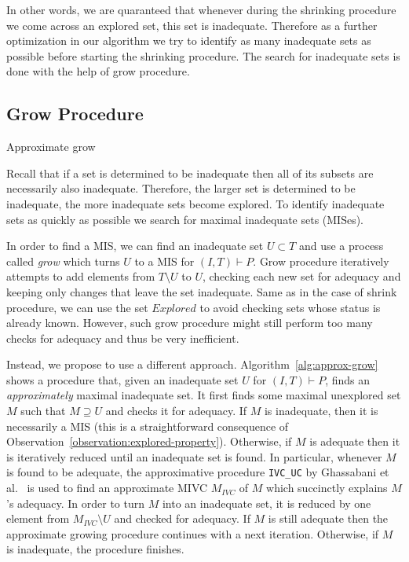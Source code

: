 In other words, we are quaranteed that whenever during the shrinking procedure we come across an explored set, this set is inadequate. Therefore as a further optimization in our algorithm we try to identify as many inadequate sets as possible before starting the shrinking procedure. The search for inadequate sets is done with the help  of grow procedure.






\subsection{Grow Procedure}
\begin{algorithm}[!t]
\label{alg:approx-grow}

\caption{Approximate grow}
\end{algorithm}

Recall that if a set is determined to be inadequate then all of its subsets are necessarily also inadequate. Therefore, the larger set is determined to be inadequate, the more inadequate sets become explored.  %
To identify inadequate sets as quickly as possible we search for maximal inadequate sets (MISes).

In order to find a MIS, we can find an inadequate set $U \subset T$ and use a process called \emph{grow} which turns $U$ to a MIS for $(I,T) \vdash P$.
Grow procedure iteratively attempts to add elements from $T \setminus U$ to $U$, checking each new set for adequacy and keeping only changes that leave the set inadequate. Same as in the case of shrink procedure, we can use the set $Explored$ to avoid checking sets whose status is already known.
However, such grow procedure might still perform too many checks for adequacy and thus be very inefficient.


Instead, we propose to use a different approach. Algorithm~\ref{alg:approx-grow} shows a procedure that, given an inadequate set $U$ for $(I, T) \vdash P$, finds an \emph{approximately} maximal inadequate set.
It first finds some maximal unexplored set $M$ such that $M \supseteq U$ and checks it for adequacy.
If $M$ is inadequate, then it is necessarily a MIS
(this is a straightforward consequence of Observation~\ref{observation:explored-property}).
Otherwise, if $M$ is adequate then it is iteratively reduced until an inadequate set is found.
In particular, whenever $M$ is found to be adequate, the approximative procedure \texttt{IVC\_UC} by Ghassabani et al.~\cite{single-mivc} is used to find an approximate MIVC $M_{IVC}$ of $M$ which succinctly explains $M$'s adequacy. In order to turn $M$ into an inadequate set, it is reduced by one element from $M_{IVC} \setminus U$ and checked for adequacy. If $M$ is still adequate then the approximate growing procedure continues with a next iteration. Otherwise, if $M$ is inadequate, the procedure finishes.

